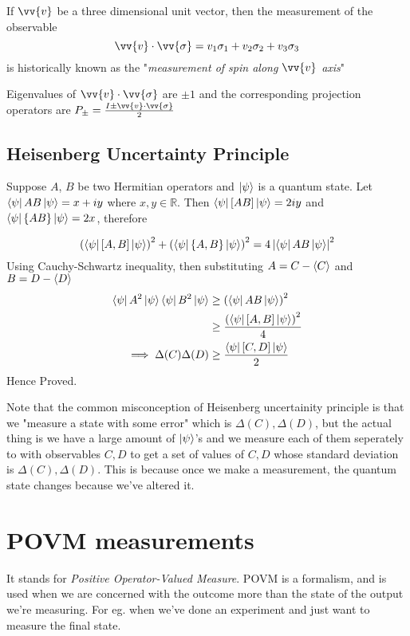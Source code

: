 If $\vv{v}$ be a three dimensional unit vector, then the measurement of the observable
\begin{equation}
    \vv{v}\cdot \vv{\sigma} = v_1\sigma_1 + v_2\sigma_2 + v_3\sigma_3
\end{equation}
is historically known as the "\textit{measurement of spin along $\vv{v}$ axis}"

\begin{remark}
    Eigenvalues of $\vv{v}\cdot\vv{\sigma}$ are $\pm 1$ and the corresponding projection operators are $P_{\pm} = \frac{I \pm \vv{v}\cdot\vv{\sigma}}{2}$
\end{remark} 

\subsection{Heisenberg Uncertainty Principle}
Suppose $A$, $B$ be two Hermitian operators and $\ket{\psi}$ is a quantum state. Let $\bra{\psi}AB\ket{\psi} = x+iy$ where $x, y \in \mathbb{R}$. Then $\bra{\psi}[AB]\ket{\psi} = 2iy$ and $\bra{\psi}\{AB\}\ket{\psi} = 2x$, therefore

\begin{equation}
    \left( \bra{\psi}[A,B]\ket{\psi} \right)^2 + 
    \left( \bra{\psi} \{A,B\} \ket{\psi} \right)^2 = 
    4\left| \bra{\psi} AB \ket{\psi} \right|^2
\end{equation}
Using Cauchy-Schwartz inequality, then substituting $A = C - \braket{C}$ and $B = D-\braket{D}$
\begin{align}
    \bra{\psi}A^2\ket{\psi}\bra{\psi}B^2\ket{\psi} &\geq \left(\bra{\psi}AB\ket{\psi}\right)^2 \\
    &\geq \frac{\left( \bra{\psi}[A, B]\ket{\psi} \right)^2}{4} \\
    \implies \Delta(C)\Delta(D) &\geq
    \frac{\bra{\psi}[C, D]\ket{\psi}}{2}
\end{align}
Hence Proved.

Note that the common misconception of Heisenberg uncertainity principle is
that we "measure a state with some error" which is $\Delta(C), \Delta(D)$, but the actual thing is we have a large amount of $\ket{\psi}$'s and we measure each of them seperately to with observables $C, D$ to get a set of values of $C, D$ whose standard deviation is $\Delta(C), \Delta(D)$. This is because once we make a measurement, the quantum state changes because we've altered it.

\section{POVM measurements}
It stands for \textit{Positive Operator-Valued Measure}. POVM is a formalism, and is used when we are concerned with the outcome more than the state of the output we're measuring. For eg. when we've done an experiment and just want to measure the final state.

